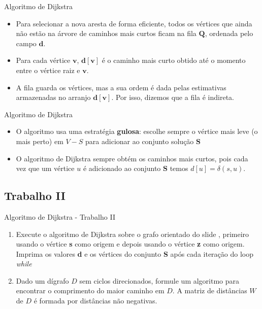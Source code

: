 \documentclass[xcolor=table]{beamer}
\begin{document}
\begin{frame}{Algoritmo de Dijkstra}
  \begin{itemize}
    \item Para selecionar a nova aresta de forma eficiente, todos os vértices que ainda não estão na árvore de caminhos mais curtos ficam na fila $\mathbf{Q}$, ordenada pelo campo $\mathbf{d}$.
    \item Para cada vértice $\mathbf{v}$, $\mathbf{d[v]}$ é o caminho mais curto obtido até o momento entre o vértice raiz e $\mathbf{v}$.
    \item A fila guarda os vértices, mas a sua ordem é dada pelas estimativas armazenadas no arranjo $\mathbf{d[v]}$. Por isso, dizemos que a fila é indireta.
  \end{itemize}
\end{frame}

\begin{frame}{Algoritmo de Dijkstra}
  \begin{itemize}
    \item O algoritmo usa uma estratégia \textbf{gulosa}: escolhe sempre o vértice mais leve (o mais perto) em $V-S$ para adicionar ao conjunto solução $\mathbf{S}$
    \item O algoritmo de Dijkstra sempre obtém os caminhos mais curtos, pois cada vez que um vértice $u$ é adicionado ao conjunto $\mathbf{S}$ temos $d[u] = \delta(s,u)$.
  \end{itemize}
\end{frame}

\subsection{Trabalho II}
\begin{frame}{Algoritmo de Dijkstra - Trabalho II}
  \begin{enumerate}
    \item Execute o algoritmo de Dijkstra sobre o grafo orientado do slide \pageref{fig:Dijkstra_grafo_1}, primeiro usando o vértice \textbf{s} como origem e depois usando o vértice \textbf{z} como origem. Imprima os valores \textbf{d} e os vértices do conjunto \textbf{S} após cada iteração do loop \textit{while}
    \item Dado um dígrafo $D$ sem ciclos direcionados, formule um algoritmo para encontrar o comprimento do maior caminho em $D$. A matriz de distâncias $W$ de $D$ é formada por distâncias não negativas.
  \end{enumerate}
\end{frame}
\end{document}
